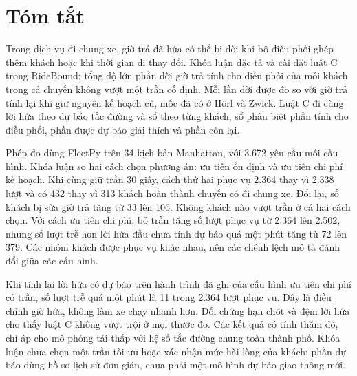 \chapter*{Tóm tắt}

Trong dịch vụ đi chung xe, giờ trả đã hứa có thể bị dời khi bộ điều phối ghép thêm khách hoặc khi thời gian đi thay
đổi. Khóa luận đặc tả và cài đặt luật C trong RideBound: tổng độ lớn phần dời giờ trả tính cho điều phối của mỗi
khách trong cả chuyến không vượt một trần cố định. Mỗi lần dời được đo so với giờ trả tính lại khi giữ nguyên kế
hoạch cũ, mốc đã có ở Hörl và Zwick. Luật C đi cùng lời hứa theo dự báo tắc đường và sổ theo từng khách; sổ phân
biệt phần tính cho điều phối, phần được dự báo giải thích và phần còn lại.

Phép đo dùng FleetPy trên 34 kịch bản Manhattan, với 3.672 yêu cầu mỗi cấu hình. Khóa luận so hai cách chọn phương
án: ưu tiên ổn định và ưu tiên chi phí kế hoạch. Khi cùng giữ trần 30 giây, cách thứ hai phục vụ 2.364 thay vì 2.338
lượt và có 432 thay vì 313 khách hoàn thành chuyến có đi chung xe. Đổi lại, số khách bị sửa giờ trả tăng từ 33 lên
106. Không khách nào vượt trần ở cả hai cách chọn. Với cách ưu tiên chi phí, bỏ trần tăng số lượt phục vụ từ 2.364
lên 2.502, nhưng số lượt trễ hơn lời hứa đầu chưa tính dự báo quá một phút tăng từ 72 lên 379. Các nhóm khách được
phục vụ khác nhau, nên các chênh lệch mô tả đánh đổi giữa các cấu hình.

Khi tính lại lời hứa có dự báo trên hành trình đã ghi của cấu hình ưu tiên chi phí có trần, số lượt trễ quá một
phút là 11 trong 2.364 lượt phục vụ. Đây là điều chỉnh giờ hứa, không làm xe chạy nhanh hơn. Đối chứng hạn chót
và đệm lời hứa cho thấy luật C không vượt trội ở mọi thước đo. Các kết quả có tính thăm dò, chỉ áp cho mô phỏng tải
thấp với hệ số tắc đường chung toàn thành phố. Khóa luận chưa chọn một trần tối ưu hoặc xác nhận mức hài lòng của
khách; phần dự báo dùng hồ sơ lịch sử đơn giản, chưa phải một mô hình dự báo giao thông mới.

